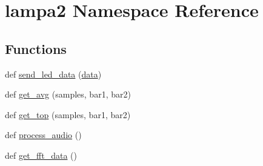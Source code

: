 \hypertarget{namespacelampa2}{}\section{lampa2 Namespace Reference}
\label{namespacelampa2}
\subsection*{Functions}
\begin{DoxyCompactItemize}
\item 
def \hyperlink{namespacelampa2_afd61a749e36f0c6576cde703f13b8fbe}{send\+\_\+led\+\_\+data} (\hyperlink{namespacelampa2_a8c1b8cd83e7f9e09b3ce038d2bb48978}{data})
\item 
def \hyperlink{namespacelampa2_a512f34abc1683ef72bcb0204c5239323}{get\+\_\+avg} (samples, bar1, bar2)
\item 
def \hyperlink{namespacelampa2_adaab29c56d95f42dd9452720dab1eef2}{get\+\_\+top} (samples, bar1, bar2)
\item 
def \hyperlink{namespacelampa2_a515ba3636c292fdee2f983310648d6aa}{process\+\_\+audio} ()
\item 
def \hyperlink{namespacelampa2_a61fc5a989d9d50e6d469d21f3854d572}{get\+\_\+fft\+\_\+data} ()
\end{DoxyCompactItemize}
